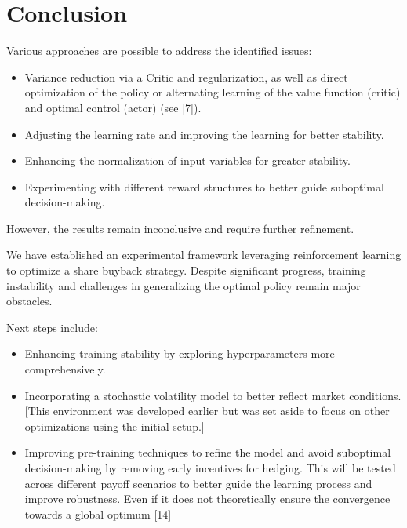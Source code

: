 \documentclass[a4paper, 12pt]{article}
\begin{document}
\section{Conclusion}
Various approaches are possible to address the identified issues:
\begin{itemize}
    \item Variance reduction via a Critic and regularization, as well as direct optimization of the policy or alternating learning of the value function (critic) and optimal control (actor) (see [7]).
    \item Adjusting the learning rate and improving the learning for better stability. 
    \item Enhancing the normalization of input variables for greater stability.
    \item Experimenting with different reward structures to better guide suboptimal decision-making.
\end{itemize}

However, the results remain inconclusive and require further refinement.

We have established an experimental framework leveraging reinforcement learning to optimize a share buyback strategy. Despite significant progress, training instability and challenges in generalizing the optimal policy remain major obstacles.

Next steps include:
\begin{itemize}
    \item Enhancing training stability by exploring hyperparameters more comprehensively.
    \item Incorporating a stochastic volatility model to better reflect market conditions. [This environment was developed earlier but was set aside to focus on other optimizations using the initial setup.]
    \item Improving pre-training techniques to refine the model and avoid suboptimal decision-making by removing early incentives for hedging. This will be tested across different payoff scenarios to better guide the learning process and improve robustness. Even if it does not theoretically ensure the convergence towards a global optimum [14]
\end{itemize}
\end{document}
